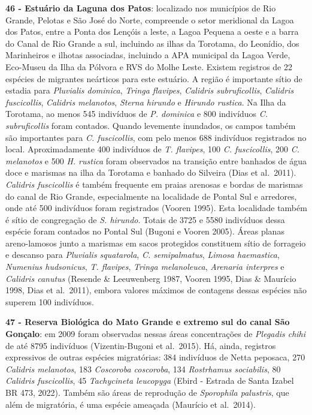 \documentclass[
  oneside]{scrbook}
\begin{document}
\textbf{46 - Estuário da Laguna dos Patos}: localizado nos municípios de Rio Grande, Pelotas e São José do Norte, compreende o setor meridional da Lagoa dos Patos, entre a Ponta dos Lençóis a leste, a Lagoa Pequena a oeste e a barra do Canal de Rio Grande a sul, incluindo as ilhas da Torotama, do Leonídio, dos Marinheiros e ilhotas associadas, incluindo a APA municipal da Lagoa Verde, Eco-Museu da Ilha da Pólvora e RVS do Molhe Leste. Existem registros de 22 espécies de migrantes neárticos para este estuário. A região é importante sítio de estadia para \emph{Pluvialis dominica}, \emph{Tringa flavipes}, \emph{Calidris subruficollis}, \emph{Calidris fuscicollis}, \emph{Calidris melanotos}, \emph{Sterna hirundo} e \emph{Hirundo rustica}. Na Ilha da Torotama, ao menos 545 indivíduos de \emph{P. dominica} e 800 indivíduos \emph{C. subruficollis} foram contados. Quando levemente inundados, os campos também são importantes para \emph{C. fuscicollis}, com pelo menos 688 indivíduos registrados no local. Aproximadamente 400 indivíduos de \emph{T. flavipes}, 100 \emph{C. fuscicollis}, 200 \emph{C. melanotos} e 500 \emph{H. rustica} foram observados na transição entre banhados de água doce e marismas na ilha da Torotama e banhado do Silveira (Dias et al.~2011). \emph{Calidris fuscicollis} é também frequente em praias arenosas e bordas de marismas do canal de Rio Grande, especialmente na localidade de Pontal Sul e arredores, onde até 500 indivíduos foram registrados (Vooren 1995). Esta localidade também é sítio de congregação de \emph{S. hirundo}. Totais de 3725 e 5580 indivíduos dessa espécie foram contados no Pontal Sul (Bugoni e Vooren 2005). Áreas planas areno-lamosos junto a marismas em sacos protegidos constituem sítio de forrageio e descanso para \emph{Pluvialis squatarola}, \emph{C. semipalmatus}, \emph{Limosa haemastica}, \emph{Numenius hudsonicus}, \emph{T. flavipes}, \emph{Tringa melanoleuca}, \emph{Arenaria interpres} e \emph{Calidris canutus} (Resende \& Leeuwenberg 1987, Vooren 1995, Dias \& Maurício 1998, Dias et al.~2011), embora valores máximos de contagens dessas espécies não superem 100 indivíduos.

\textbf{47 - Reserva Biológica do Mato Grande e extremo sul do canal São Gonçalo}: em 2009 foram observadas nessas áreas concentrações de \emph{Plegadis chihi} de até 8795 indivíduos (Vizentin-Bugoni et al.~2015). Há, ainda, registros expressivos de outras espécies migratórias: 384 indivíduos de Netta peposaca, 270 \emph{Calidris melanotos}, 183 \emph{Coscoroba coscoroba}, 134 \emph{Rostrhamus sociabilis}, 80 \emph{Calidris fuscicollis}, 45 \emph{Tachycineta leucopyga} (Ebird - Estrada de Santa Izabel BR 473, 2022). Também são áreas de reprodução de \emph{Sporophila palustris}, que além de migratória, é uma espécie ameaçada (Maurício et al.~2014).
\end{document}
